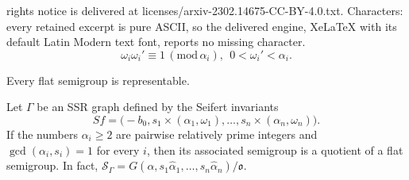 \documentclass[10pt,a4paper]{amsart}
\newcommand{\G}{\Gamma}
\newcommand{\Se}{\mathcal{S}}
\newcommand{\al}{\alpha}
\newcommand{\oo}{\mathfrak{o}}
\newcommand{\w}{\omega}
\begin{document}
rights notice is delivered at licenses/arxiv-2302.14675-CC-BY-4.0.txt. Characters: every retained excerpt is pure ASCII, so the delivered engine, XeLaTeX with its default Latin Modern text font, reports no missing character.
\begin{equation}\label{eq:w'}
\omega_i\omega_i'\equiv 1 \, (\mathrm{mod} \,\alpha_i), \ \ 0< \omega_i'<\alpha_i.
\end{equation}

\begin{thm}
    \label{thm_flat_rep}
    Every flat semigroup is representable.
\end{thm}

\begin{thm}
     \label{flat:divisor}
     Let $\G$ be an SSR  graph defined by the Seifert invariants   
     \[
         Sf=\big(-b_0,s_1\times(\al_1,\w_1),\dots,s_n\times(\al_n,\w_n)
         \big) .    
     \]
     If the numbers $\al_i\geq 2$  are pairwise relatively prime integers and $\gcd(\al_i,s_i)=1$ for every  $i$,
     then its associated semigroup is a quotient of a flat semigroup.
     In fact,
     $\Se_{\G}=G(\al,s_1 \widehat{\al}_1,\dots,s_n\widehat{\al}_n)/\oo$.
 \end{thm}
\end{document}
